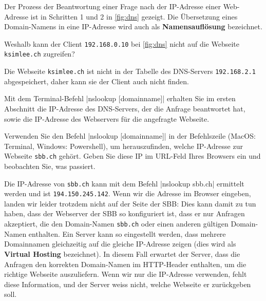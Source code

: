 Der Prozess der Beantwortung einer Frage nach der \gls{IP}-Adresse einer Web-Adresse ist in Schritten 1 und 2 in \cref{fig:dns} gezeigt. Die Übersetzung eines Domain-Namens in eine \gls{IP}-Adresse wird auch als \textbf{Namensauflösung} bezeichnet.

\begin{myexercise}
	Weshalb kann der Client \texttt{192.168.0.10} bei \cref{fig:dns} nicht auf die Webseite \texttt{ksimlee.ch} zugreifen?
	\begin{myanswer}
		Die Webseite \texttt{ksimlee.ch} ist nicht in der Tabelle des \gls{DNS}-Servers \texttt{192.168.2.1} abgespeichert, daher kann sie der Client auch nicht finden.
	\end{myanswer}
\end{myexercise}




Mit dem Terminal-Befehl \commandbox*|nslookup [domainname]| erhalten Sie im ersten Abschnitt die \gls{IP}-Adresse des \gls{DNS}-Servers, der die Anfrage beantwortet hat, sowie die \gls{IP}-Adresse des Webservers für die angefragte Webseite.


\begin{myexercise}
	Verwenden Sie den Befehl \commandbox*|nslookup [domainname]| in der Befehlszeile (MacOS: Terminal, Windows: Powershell), um herauszufinden, welche \gls{IP}-Adresse zur Webseite \texttt{sbb.ch} gehört. Geben Sie diese \gls{IP} im \gls{URL}-Feld Ihres Browsers ein und beobachten Sie, was passiert.
	\begin{myanswer}
		Die \gls{IP}-Adresse von \texttt{sbb.ch} kann mit dem Befehl \commandbox*|nslookup sbb.ch| ermittelt werden und ist \texttt{194.150.245.142}. Wenn wir die Adresse im Browser eingeben, landen wir leider trotzdem nicht auf der Seite der SBB: Dies kann damit zu tun haben, dass der Webserver der SBB so konfiguriert ist, dass er nur Anfragen akzeptiert, die den Domain-Namen \texttt{sbb.ch} oder einen anderen gültigen Domain-Namen enthalten. Ein Server kann so eingestellt werden, dass mehrere Domainnamen gleichzeitig auf die gleiche IP-Adresse zeigen (dies wird als \textbf{Virtual Hosting} bezeichnet). In diesem Fall erwartet der Server, dass die Anfragen den korrekten Domain-Namen im \gls{HTTP}-Header enthalten, um die richtige Webseite auszuliefern. Wenn wir nur die IP-Adresse verwenden, fehlt diese Information, und der Server weiss nicht, welche Webseite er zurückgeben soll.
	\end{myanswer}
\end{myexercise}

